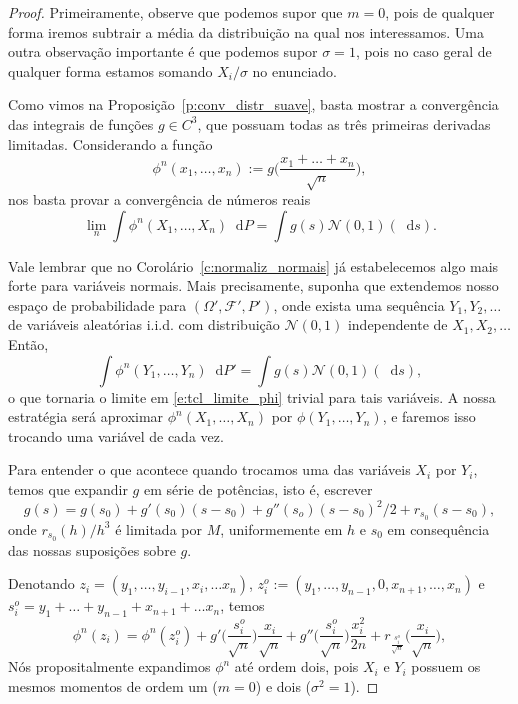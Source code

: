 \documentclass[reqno]{article}
\newcommand*\1{\mathds{1}}
\renewcommand*\d{\mathop{}\!\mathrm{d}}
\begin{document}
\begin{proof}
  Primeiramente, observe que podemos supor que $m = 0$, pois de qualquer forma iremos subtrair a média da distribuição na qual nos interessamos.
  Uma outra observação importante é que podemos supor $\sigma = 1$, pois no caso geral de qualquer forma estamos somando $X_i/\sigma$ no enunciado.

  Como vimos na Proposição~\ref{p:conv_distr_suave}, basta mostrar a convergência das integrais de funções $g \in C^3$, que possuam todas as três primeiras derivadas limitadas.
  Considerando a função
  \begin{equation}
    \phi^n(x_1, \dots, x_n) := g\Big(\frac{x_1 + \dots + x_n}{\sqrt{n}} \Big),
  \end{equation}
  nos basta provar a convergência de números reais
  \begin{equation}
    \label{e:tcl_limite_phi}
    \lim_n \int \phi^n(X_1, \dots, X_n) \d P = \int g(s) \mathcal{N}(0,1)(\d s).
  \end{equation}

  Vale lembrar que no Corolário~\ref{c:normaliz_normais} já estabelecemos algo mais forte para variáveis normais.
  Mais precisamente, suponha que extendemos nosso espaço de probabilidade para $(\Omega', \mathcal{F}', P')$, onde exista uma sequência $Y_1, Y_2, \dots$ de variáveis aleatórias i.i.d. com distribuição $\mathcal{N}(0,1)$ independente de $X_1, X_2, \dots$
  Então,
  \begin{equation}
    \int \phi^n(Y_1, \dots, Y_n) \d P' = \int g(s) \mathcal{N}(0,1) (\d s),
  \end{equation}
  o que tornaria o limite em \eqref{e:tcl_limite_phi} trivial para tais variáveis.
  A nossa estratégia será aproximar $\phi^n(X_1, \dots, X_n)$ por $\phi(Y_1, \dots, Y_n)$, e faremos isso trocando uma variável de cada vez.

  Para entender o que acontece quando trocamos uma das variáveis $X_i$ por $Y_i$, temos que expandir $g$ em série de potências, isto é, escrever
  \begin{equation}
    g(s) = g(s_0) + g'(s_0)(s - s_0) + g''(s_o)(s-s_0)^2/2 + r_{s_0}(s - s_0),
  \end{equation}
  onde $r_{s_0}(h)/h^3$ é limitada por $M$, uniformemente em $h$ e $s_0$ em consequência das nossas suposições sobre $g$.

  Denotando $z_i = (y_1, \dots, y_{i-1}, x_i, \dots x_n)$, $z_i^o := (y_1, \dots, y_{n-1}, 0, x_{n+1}, \dots, x_n)$ e $s_i^o = y_1 + \dots + y_{n-1} + x_{n+1} + \dots x_n$, temos
  \begin{equation}
    \phi^n(z_i) %
    = \phi^n(z_i^o) + g' \Big( \frac{s_i^o}{\sqrt{n}} \Big) \frac{x_i}{\sqrt{n}} + g'' \Big( \frac{s_i^o}{\sqrt{n}} \Big) \frac{x_i^2}{2n} + r_{\frac{s_i^o}{\sqrt{n}}} \Big( \frac{x_i}{\sqrt{n}} \Big),
  \end{equation}
  Nós propositalmente expandimos $\phi^n$ até ordem dois, pois $X_i$ e $Y_i$ possuem os mesmos momentos de ordem um ($m=0$) e dois ($\sigma^2=1$).


\end{proof}
\end{document}
